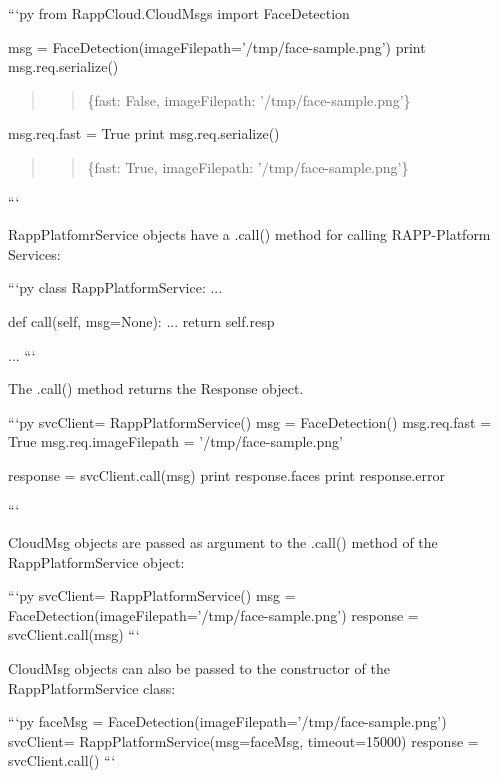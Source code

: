 ```py from Rapp\-Cloud.\-Cloud\-Msgs import Face\-Detection

msg = Face\-Detection(image\-Filepath='/tmp/face-\/sample.png') print msg.\-req.\-serialize() \begin{quotation}
\begin{quotation}
\{fast\-: False, image\-Filepath\-: '/tmp/face-\/sample.png'\}

\end{quotation}


\end{quotation}


msg.\-req.\-fast = True print msg.\-req.\-serialize() \begin{quotation}
\begin{quotation}
\{fast\-: True, image\-Filepath\-: '/tmp/face-\/sample.png'\}

\end{quotation}


\end{quotation}
```

{\ttfamily Rapp\-Platfomr\-Service} objects have a {\ttfamily .call()} method for calling R\-A\-P\-P-\/\-Platform Services\-:

```py class Rapp\-Platform\-Service\-: ...

def call(self, msg=None)\-: ... return self.\-resp

... ```

The {\ttfamily .call()} method returns the Response object.

```py svc\-Client= Rapp\-Platform\-Service() msg = Face\-Detection() msg.\-req.\-fast = True msg.\-req.\-image\-Filepath = '/tmp/face-\/sample.png'

response = svc\-Client.\-call(msg) print response.\-faces print response.\-error

```

Cloud\-Msg objects are passed as argument to the {\ttfamily .call()} method of the {\ttfamily Rapp\-Platform\-Service} object\-:

```py svc\-Client= Rapp\-Platform\-Service() msg = Face\-Detection(image\-Filepath='/tmp/face-\/sample.png') response = svc\-Client.\-call(msg) ```

{\ttfamily Cloud\-Msg} objects can also be passed to the constructor of the {\ttfamily Rapp\-Platform\-Service} class\-:

```py face\-Msg = Face\-Detection(image\-Filepath='/tmp/face-\/sample.png') svc\-Client= Rapp\-Platform\-Service(msg=face\-Msg, timeout=15000) response = svc\-Client.\-call() ```

